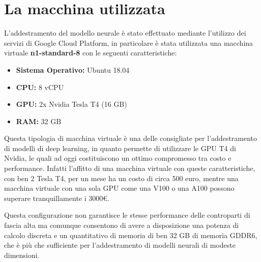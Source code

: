 \section{La macchina utilizzata\ok}
L'addestramento del modello neurale è stato effettuato mediante l'utilizzo dei servizi di Google Cloud Platform, in particolare è stata 
utilizzata una macchina virtuale \textbf{n1-standard-8} con le seguenti caratteristiche:

\begin{itemize}
    \item \textbf{Sistema Operativo:} Ubuntu 18.04
    \item \textbf{CPU:} 8 vCPU
    \item \textbf{GPU:} 2x Nvidia Tesla T4 (16 GB)
    \item \textbf{RAM:} 32 GB 
\end{itemize}

Questa tipologia di macchina virtuale è una delle consigliate per l'addestramento di modelli di deep learning, in quanto permette di utilizzare
le GPU T4 di Nvidia, le quali ad oggi costituiscono un ottimo compromesso tra costo e performance. Infatti l'affitto di una macchina
virtuale con queste caratteristiche, con ben 2 Tesla T4, per un mese ha un costo di circa 500 euro, mentre una macchina virtuale con una sola GPU come una V100 o una A100
possono superare tranquillamente i 3000€.

Questa configurazione non garantisce le stesse performance delle controparti di fascia alta ma comunque consentono di avere a disposizione
una potenza di calcolo discreta e un quantitativo di memoria di ben 32 GB di memoria GDDR6, che è più che sufficiente per l'addestramento di modelli
neurali di modeste dimensioni.




